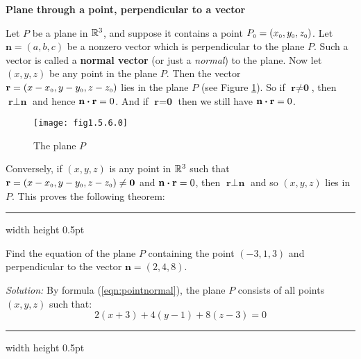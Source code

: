 \par\noindent\textbf{\large{Plane through a point, perpendicular to a vector}}\normalsize\vspace{1.5mm}

Let $P$ be a plane in $\mathbb{R}^{3}$, and suppose it contains a point
$P_{\scriptscriptstyle 0} = (x_{\scriptscriptstyle 0},y_{\scriptscriptstyle 0},z_{\scriptscriptstyle 0})$. Let $\textbf{n} = (a,b,c)$ be a nonzero vector which is
perpendicular to the plane $P$. Such a vector is called a \textbf{normal vector} (or just a \emph{normal}) to the plane.
 Now let $(x,y,z)$ be any point in the plane $P$. Then the vector
$\textbf{r} = (x - x_{\scriptscriptstyle 0},y - y_{\scriptscriptstyle 0},z - z_{\scriptscriptstyle 0})$ lies in the plane $P$ (see Figure \ref{fig:planenorm}).
So if $\textbf{r} \ne \textbf{0}$, then $\textbf{r} \perp \textbf{n}$ and hence $\textbf{n} \bm{\cdot} \textbf{r} = 0$.
And if $\textbf{r} = \textbf{0}$ then we still have $\textbf{n} \bm{\cdot} \textbf{r} = 0$.

\begin{figure}[h]
 \begin{center}
  \texttt{[image: fig1.5.6.0]}
 \end{center}\vspace{-5mm}
 \caption[]{\quad The plane $P$}
 \label{fig:planenorm}
\end{figure}

Conversely, if $(x,y,z)$ is any point in $\mathbb{R}^{3}$ such that $\textbf{r} = (x - x_{\scriptscriptstyle 0},y - y_{\scriptscriptstyle 0},z -
z_{\scriptscriptstyle 0}) \ne \textbf{0}$ and $\textbf{n} \bm{\cdot} \textbf{r} = 0$, then $\textbf{r} \perp \textbf{n}$ and
so $(x,y,z)$ lies in $P$. This proves the following theorem:

\hrule width \textwidth height 0.5pt
\begin{exmp}\label{exmp:pointnormal}
 Find the equation of the plane $P$ containing the point $(-3,1,3)$ and perpendicular to the vector $\textbf{n} =
 (2,4,8)$.\vspace{1mm}
 \par\noindent\emph{Solution:} By formula (\ref{eqn:pointnormal}), the plane $P$ consists of all points $(x,y,z)$ such
 that:
 \begin{displaymath}
  2(x + 3) + 4(y - 1) + 8(z - 3) = 0
 \end{displaymath}
\end{exmp}
\hrule width \textwidth height 0.5pt
\vspace{2mm}

